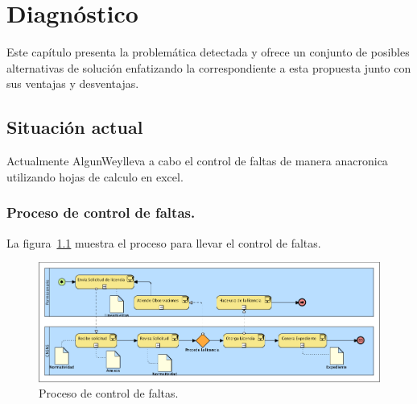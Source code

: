 \documentclass[10pt]{book}
\newcommand{\cliente}{AlgunWey}
\begin{document}


\chapter{Diagnóstico} 

	Este capítulo presenta la problemática detectada y ofrece un conjunto de posibles alternativas de solución enfatizando la correspondiente a esta propuesta junto con sus ventajas y desventajas.
	
\section{Situación actual}

	Actualmente \cliente lleva a cabo el control de faltas de manera anacronica utilizando hojas de calculo en excel.
	
\subsection{Proceso de control de faltas.}

	La figura~\ref{fig:procesoLic} muestra el proceso para llevar el control de faltas.

\begin{figure}[htbp!]
	\begin{center}
		\includegraphics[width=\textwidth]{images/procesoLic}
		\caption{Proceso de control de faltas.}
		\label{fig:procesoLic}
	\end{center}
\end{figure}
\end{document}

